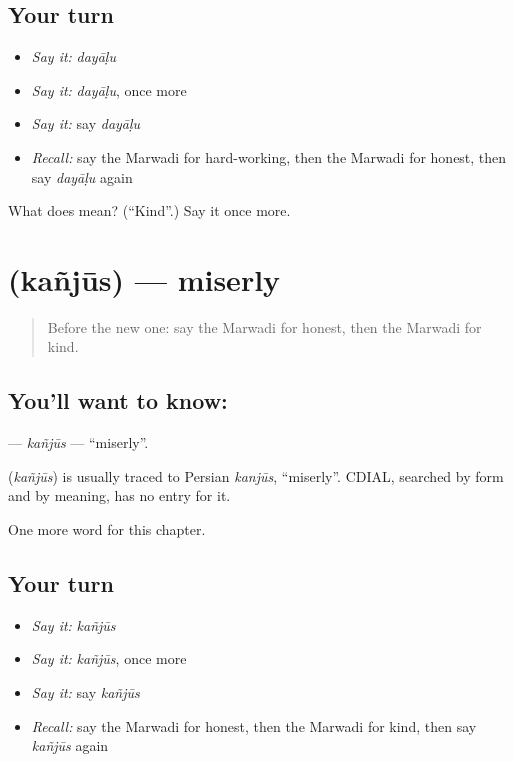 \subsection*{Your turn}
\begin{itemize}
\raggedright
  \item \emph{Say it:} \emph{dayāḷu}
  \item \emph{Say it:} \emph{dayāḷu}, once more
  \item \emph{Say it:} say \emph{dayāḷu}
  \item \emph{Recall:} say the Marwadi for hard-working, then the Marwadi for honest, then say \emph{dayāḷu} again
\end{itemize}

\begin{tcolorbox}[breakable,colback=teal!4,colframe=teal!35!black,title={Before you move on}]
What does  mean? (\textquotedblleft{}Kind\textquotedblright{}.) Say it once more.
\end{tcolorbox}
\section[\texorpdfstring{\mw{कंजूस} (kañjūs)}{कंजूस (kañjūs)}]{ (kañjūs) — miserly}

\label{lesson:MW-C147-kanjus}



\begin{quote}
Before the new one: say the Marwadi for honest, then the Marwadi for kind.
\end{quote}

\subsection*{You'll want to know: }
\textbf{} — \emph{kañjūs} — \textquotedblleft{}miserly\textquotedblright{}.

\begin{cousinweb}
\textbf{} (\emph{kañjūs}) is usually traced to Persian \emph{kanjūs}, \textquotedblleft{}miserly\textquotedblright{}. CDIAL, searched by form and by meaning, has no entry for it.
\end{cousinweb}

\begin{grammarlens}[title={What you've built}]
One more word for this chapter.
\end{grammarlens}

\subsection*{Your turn}
\begin{itemize}
\raggedright
  \item \emph{Say it:} \emph{kañjūs}
  \item \emph{Say it:} \emph{kañjūs}, once more
  \item \emph{Say it:} say \emph{kañjūs}
  \item \emph{Recall:} say the Marwadi for honest, then the Marwadi for kind, then say \emph{kañjūs} again
\end{itemize}

